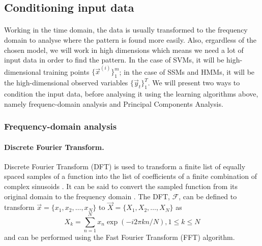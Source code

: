 \subsection{Conditioning input data}
\paragraph{}
	Working in the time domain, the data is usually transformed to the frequency domain to analyse where the pattern is found more easily. Also, ergardless of the chosen model, we will work in high dimensions which means we need a lot of input data in order to find the pattern. In the case of SVMs, it will be high-dimensional training points $\{\vec x^{(i)}\}_1^m$; in the case of SSMs and HMMs, it will be the high-dimensional observed variables $\{\vec y_t\}_1^T$. We will present two ways to condition the input data, before analysing it using the learning algorithms above, namely frequenc-domain analysis and Principal Components Analysis.
\subsubsection{Frequency-domain analysis}

\paragraph{Discrete Fourier Transform.}
	Discrete Fourier Transform (DFT) is used to transform a finite list of equally spaced samples of a function into the list of coefficients of a finite combination of complex sinusoids \cite{wiki:DFT}. It can be said to convert the sampled function from its original domain to the frequency domain \cite{wiki:DFT}. The DFT, $\mathcal{F}$, can be defined to transform $\vec x = \{x_1, x_2, \dotsc, x_{N}\}$ to $\vec X = \{X_1, X_2, \dotsc, X_{N}\}$ as
	\begin{equation}
		X_k = \sum_{n = 1}^{N} x_n \exp{(-i2\pi k n / N)}, 1 \leq k \leq N
	\end{equation}
	and can be performed using the Fast Fourier Transform (FFT) algorithm.

